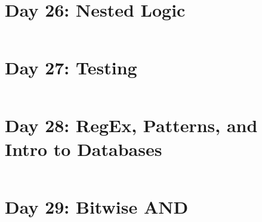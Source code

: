 \documentclass[11pt,a4paper]{article}
\begin{document}
\newpage
\section{Day 26: Nested Logic}
\begin{lstlisting}
\end{lstlisting}

\newpage
\section{Day 27: Testing}
\begin{lstlisting}
\end{lstlisting}

\newpage
\section{Day 28: RegEx, Patterns, and Intro to Databases}
\begin{lstlisting}
\end{lstlisting}

\newpage
\section{Day 29: Bitwise AND}
\begin{lstlisting}
\end{lstlisting}
\end{document}
